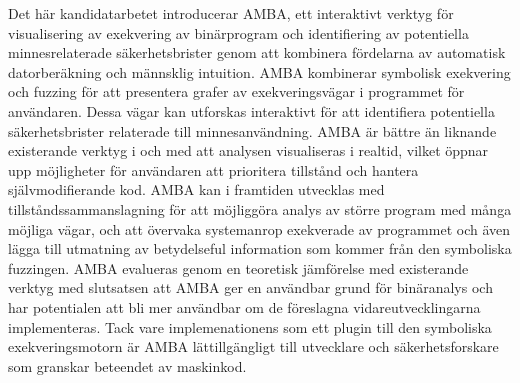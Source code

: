 Det här kandidatarbetet introducerar AMBA, ett interaktivt verktyg för
visualisering av exekvering av binärprogram och identifiering av
potentiella minnesrelaterade säkerhetsbrister genom att kombinera
fördelarna av automatisk datorberäkning och männsklig intuition.  AMBA
kombinerar symbolisk exekvering och fuzzing för att presentera grafer
av exekveringsvägar i programmet för användaren. Dessa vägar kan
utforskas interaktivt för att identifiera potentiella säkerhetsbrister
relaterade till minnesanvändning. AMBA är bättre än liknande
existerande verktyg i och med att analysen visualiseras i realtid,
vilket öppnar upp möjligheter för användaren att prioritera tillstånd
och hantera självmodifierande kod. AMBA kan i framtiden utvecklas med
tillståndssammanslagning för att möjliggöra analys av större program
med många möjliga vägar, och att övervaka systemanrop exekverade av
programmet och även lägga till utmatning av betydelseful information
som kommer från den symboliska fuzzingen. AMBA evalueras genom en
teoretisk jämförelse med existerande verktyg med slutsatsen att AMBA
ger en användbar grund för binäranalys och har potentialen att bli mer
användbar om de föreslagna vidareutvecklingarna implementeras.  Tack
vare implemenationens som ett plugin till den symboliska
exekveringsmotorn \stoe{} är AMBA lättillgängligt till utvecklare och
säkerhetsforskare som granskar beteendet av maskinkod.
